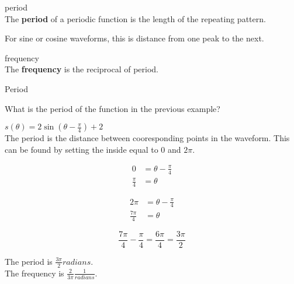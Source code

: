 \documentclass{ximera}
\begin{document}
\begin{definition} period \\

The \textbf{period} of a periodic function is the length of the repeating pattern.


For sine or cosine waveforms, this is distance from one peak to the next.

\end{definition}

\begin{definition} frequency \\

The \textbf{frequency} is the reciprocal of period.

\end{definition}














\begin{example}  Period

What is the period of the function in the previous example?



\begin{explanation}

$s(\theta) = 2 \sin\left(\theta - \frac{\pi}{4}\right) + 2$ \\


The period is the distance between cooresponding points in the waveform.  This can be found by setting the inside equal to $0$ and $2\pi$.

\begin{align*}
 0 & = \theta - \frac{\pi}{4} \\
 \frac{\pi}{4} & = \theta 
 \end{align*}

\begin{align*}
 2 \pi & = \theta - \frac{\pi}{4} \\
 \frac{7\pi}{4} & = \theta 
 \end{align*}

\[
\frac{7\pi}{4} - \frac{\pi}{4} = \frac{6\pi}{4} = \frac{3\pi}{2}
\]


\end{explanation}

The period is $\frac{3\pi}{2} radians$. \\

The frequency is $\frac{2}{3\pi} \tfrac{1}{radians}$. \\

\end{example}
\end{document}
